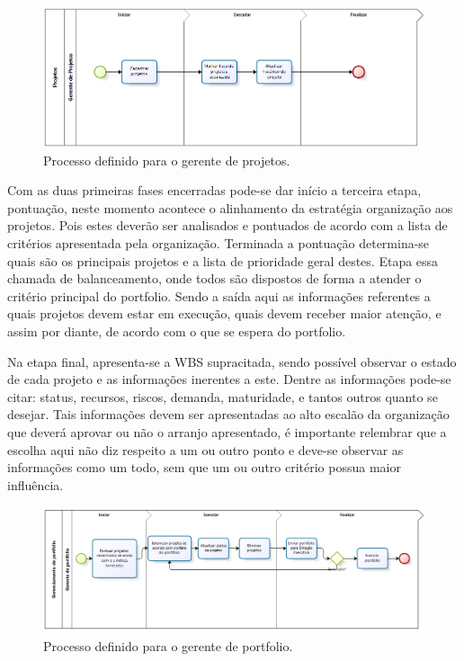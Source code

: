\documentclass[12pt,a4paper,ruledheader,tocpage=prefix,floatnumber=continuous,pagestart=folhaderosto,font=times]{abnt}
\begin{document}
\begin{figure}[H]
\centering
\includegraphics[width=.9\textwidth]{Projetos.png}
\caption{Processo definido para o gerente de projetos.}
\end{figure}

Com as duas primeiras fases encerradas pode-se dar início a terceira etapa, pontuação, neste momento acontece o alinhamento da estratégia organização 
aos projetos. Pois estes deverão ser analisados e pontuados de acordo com a lista de critérios apresentada pela organização. Terminada a pontuação 
determina-se quais são os principais projetos e a lista de prioridade geral destes. Etapa essa chamada de balanceamento, onde todos são dispostos de 
forma a atender o critério principal do portfolio. Sendo a saída aqui as informações referentes a quais projetos devem estar em execução, quais devem 
receber maior atenção, e assim por diante, de acordo com o que se espera do portfolio.

Na etapa final, apresenta-se a WBS supracitada, sendo possível observar o estado de cada projeto e as informações inerentes a este. Dentre as informações
pode-se citar: status, recursos, riscos, demanda, maturidade, e tantos outros quanto se desejar. Tais informações devem ser apresentadas ao alto escalão 
da organização que deverá aprovar ou não o arranjo apresentado, é importante relembrar que a escolha aqui não diz respeito a um ou outro ponto e deve-se 
observar as informações como um todo, sem que um ou outro critério possua maior influência. 

\begin{figure}[H]
\centering
\includegraphics[width=.9\textwidth]{GerenciaPortfolio.png}
\caption{Processo definido para o gerente de portfolio.}
\end{figure}
\end{document}
